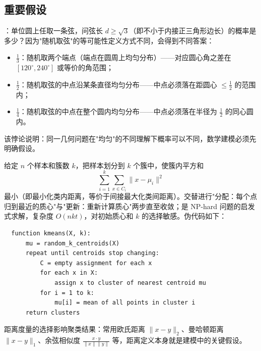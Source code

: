 \documentclass[12pt]{article}
\begin{document}
\subsection{重要假设}
\begin{exam}
  ：单位圆上任取一条弦，问弦长 $d \ge \sqrt{3}$（即不小于内接正三角形边长）的概率是多少？因为"随机取弦"的等可能性定义方式不同，会得到不同答案：
  \begin{itemize}
    \item $\frac{1}{3}$：随机取两个端点（端点在圆周上均匀分布）——对应圆心角之差在 $[120^\circ,240^\circ]$ 或等价的角范围；
    \item $\frac{1}{2}$：随机取弦的中点沿某条直径均匀分布——中点必须落在距圆心 $\le \frac12$ 的范围内；
    \item $\frac{1}{4}$：随机取弦的中点在整个圆内均匀分布——中点必须落在半径为 $\frac12$ 的同心圆内。
  \end{itemize}
  该悖论说明：同一几何问题在"均匀"的不同理解下概率可以不同，数学建模必须先明确假设。
\end{exam}
\begin{defn}[K-means 算法]
  给定 $n$ 个样本和簇数 $k$，把样本划分到 $k$ 个簇中，使簇内平方和
  \[
    \sum_{i=1}^{k}\sum_{x\in C_i}\lVert x-\mu_i\rVert^2
  \]
  最小（即最小化类内距离，等价于间接最大化类间距离）。交替进行"分配：每个点归到最近的质心"与"更新：重新计算质心"两步直至收敛；是 NP-hard 问题的启发式求解，复杂度 $O(nkt)$，对初始质心和 $k$ 的选择敏感。伪代码如下：
  \begin{verbatim}
  function kmeans(X, k):
      mu = random_k_centroids(X)
      repeat until centroids stop changing:
          C = empty assignment for each x
          for each x in X:
              assign x to cluster of nearest centroid mu
          for i = 1 to k:
              mu[i] = mean of all points in cluster i
      return clusters
  \end{verbatim}
\end{defn}

\begin{defn}[距离度量]
  距离度量的选择影响聚类结果：常用欧氏距离 $\lVert x-y\rVert_2$、曼哈顿距离 $\lVert x-y\rVert_1$、余弦相似度 $\frac{x\cdot y}{\lVert x\rVert\lVert y\rVert}$ 等，距离定义本身就是建模中的关键假设。
\end{defn}
\end{document}

